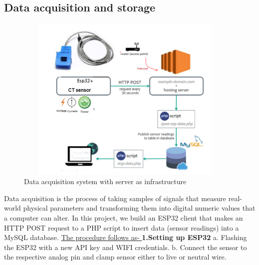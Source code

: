 \documentclass[12 pt]{report}
\begin{document}
\subsection{Data acquisition and storage}
  \begin{figure}[h!]
\centering
\includegraphics[width=10.7cm,height = 8cm,frame]{images/flow.png}
\caption{Data acquisition system with server as infrastructure}
\label{fig:Data acquisition system with server as infrastructure}
\end{figure}


 

 Data acquisition is the process of taking samples of signals that measure real-world physical parameters and transforming them into digital numeric values that a computer can alter.
 \newline
 In this project, we build an ESP32  client that makes an HTTP POST request to a PHP script to insert data (sensor readings) into a MySQL database.
 \newpage
\underline{The procedure follows as- }
 \newline
  \newline
 \textbf{1.Setting up  ESP32}
 \newline
 \newline
a. Flashing the ESP32 with a  new API key and WIFI credentials.
 \newline
b. Connect the sensor to the respective analog pin and clamp sensor either to live or neutral wire.


\newpage
\end{document}
